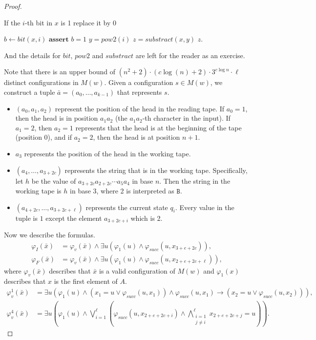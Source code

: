 \begin{proof}
	\begin{algorithm}
	\caption{If the $i$-th bit in $x$ is 1 replace it by 0}
	\begin{algorithmic}
		\State $b \gets bit(x,i)$
		\State $\textbf{assert } b = 1$
		\State $y = pow2(i)$
		\State $z = substract(x,y)$
		\State \Return $z$.
	\end{algorithmic}
	\end{algorithm}	
	And the details for $bit$, $pow2$ and $substract$ are left for the reader as an exercise.
	
	Note that there is an upper bound of $(n^2+2)\cdot (c\log(n)+2)\cdot 3^{c\log n} \cdot \ell$ distinct configurations in $M(w)$. Given a configuration $s\in M(w)$, we construct a tuple $\bar{a} = (a_0,\ldots,a_{k-1})$ that represents $s$.
	\begin{itemize}
	\item $(a_0,a_1,a_2)$ represent the position of the head in the reading tape. If $a_0 = 1$, then the head is in position $a_1a_2$ (the $a_1a_2$-th character in the input). If $a_1 = 2$, then $a_2 = 1$ represents that the head is at the beginning of the tape (position 0), and if $a_2 = 2$, then the head is at position $n+1$.
	\item $a_3$ represents the position of the head in the working tape.
	\item $(a_4,\ldots,a_{3+2c})$ represents the string that is in the working tape. Specifically, let $h$ be the value of $a_{3+2c}a_{2+2c}\cdots a_{5}a_{4}$ in base $n$. Then the string in the working tape is $h$ in base 3, where 2 is interpreted as $\texttt{B}$.
	\item $(a_{4+2c},\ldots,a_{3+2c+\ell})$ represents the current state $q_i$. Every value in the tuple is $1$ except the element $a_{3+2c+i}$ which is 2.	
	\end{itemize}
	
	
	Now we describe the formulas.
	\begin{align*}
	\varphi_I(\bar{x}) &= \varphi_v(\bar{x}) \wedge \exists u(\varphi_1(u) \wedge \varphi_{succ}(u,x_{3+e+2c})), \\
	\varphi_F(\bar{x}) &= \varphi_v(\bar{x}) \wedge \exists u(\varphi_1(u) \wedge \varphi_{succ}(u,x_{2+e+2c+\ell})),
	\end{align*}
	where $\varphi_v(\bar{x})$ describes that $\bar{x}$ is a valid configuration of $M(w)$ and $\varphi_1(x)$ describes that $x$ is the first element of $A$.
	\begin{align*}
	\varphi_v^1(\bar{x}) &= \exists u(\varphi_1(u) \wedge (x_1 = u \vee \varphi_{succ}(u,x_1)) \wedge \varphi_{succ}(u,x_1) \to (x_2 = u \vee \varphi_{succ}(u,x_2))), \\
	\varphi_v^4(\bar{x}) &= \exists u(\varphi_1(u) \wedge \bigvee_{i = 1}^{\ell}(\varphi_{succ}(u,x_{2+e+2c+i})  \wedge \bigwedge\limits_{\substack{i = 1\\ j \neq i}}^{\ell} x_{2+e+2c+j} = u)).
	\end{align*}
\end{proof}

